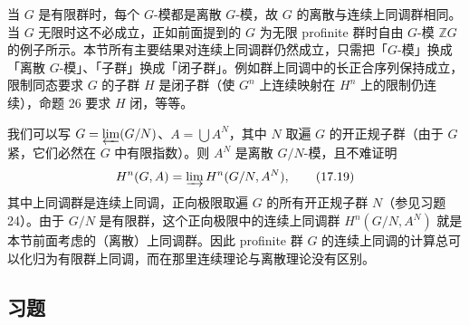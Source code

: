 当 \(G\) 是有限群时，每个 \(G\)-模都是离散 \(G\)-模，故 \(G\) 的离散与连续上同调群相同。当 \(G\) 无限时这不必成立，正如前面提到的 \(G\) 为无限 profinite 群时自由 \(G\)-模 \(\mathbb{Z}G\) 的例子所示。本节所有主要结果对连续上同调群仍然成立，只需把「\(G\)-模」换成「离散 \(G\)-模」、「子群」换成「闭子群」。例如群上同调中的长正合序列保持成立，限制同态要求 \(G\) 的子群 \(H\) 是闭子群（使 \(G^n\) 上连续映射在 \(H^n\) 上的限制仍连续），命题 26 要求 \(H\) 闭，等等。

我们可以写 \(G = \varprojlim(G/N)\)、\(A = \bigcup A^N\)，其中 \(N\) 取遍 \(G\) 的开正规子群（由于 \(G\) 紧，它们必然在 \(G\) 中有限指数）。则 \(A^N\) 是离散 \(G/N\)-模，且不难证明
\[
H^n(G, A) = \varinjlim H^n(G/N, A^N), \tag{17.19}
\]
其中上同调群是连续上同调，正向极限取遍 \(G\) 的所有开正规子群 \(N\)（参见习题 24）。由于 \(G/N\) 是有限群，这个正向极限中的连续上同调群 \(H^n(G/N, A^N)\) 就是本节前面考虑的（离散）上同调群。因此 profinite 群 \(G\) 的连续上同调的计算总可以化归为有限群上同调，而在那里连续理论与离散理论没有区别。

\subsection*{习题}

